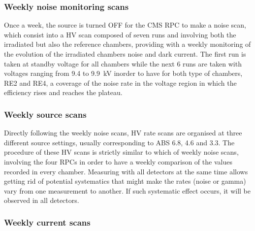 		\subsubsection{Weekly noise monitoring scans}
		\label{chapt5:sssec:noisescan}
		
	Once a week, the source is turned OFF for the CMS RPC to make a noise scan, which consist into a HV scan composed of seven runs and involving both the irradiated but also the reference chambers, providing with a weekly monitoring of the evolution of the irradiated chambers noise and dark current. The first run is taken at standby voltage for all chambers while the next 6 runs are taken with voltages ranging from 9.4 to \SI{9.9}{kV} inorder to have for both type of chambers, RE2 and RE4, a coverage of the noise rate in the voltage region in which the efficiency rises and reaches the plateau.
	
		\subsubsection{Weekly source scans}
		\label{chapt5:sssec:sourcescan}
		
	Directly following the weekly noise scans, HV rate scans are organised at three different source settings, usually corresponding to ABS 6.8, 4.6 and 3.3. The procedure of these HV scans is strictly similar to which of weekly noise scans, involving the four RPCs in order to have a weekly comparison of the values recorded in every chamber. Measuring with all detectors at the same time allows getting rid of potential systematics that might make the rates (noise or gamma) vary from one measurement to another. If such systematic effect occurs, it will be observed in all detectors.
	
		\subsubsection{Weekly current scans}
		\label{chapt5:sssec:currentscan}
		
